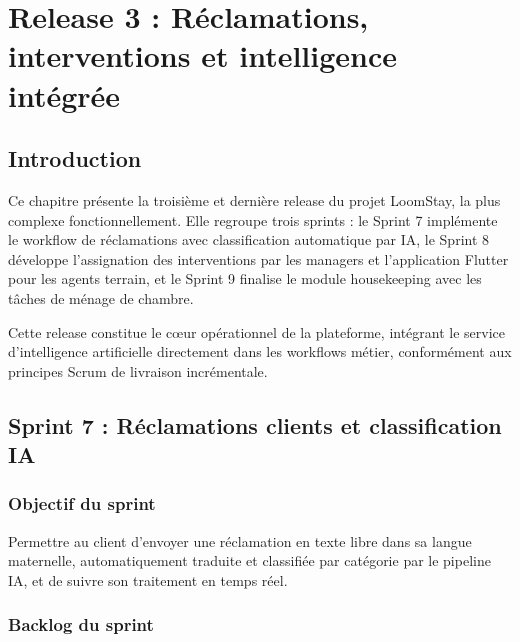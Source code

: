 
\chapter{Release 3 : Réclamations, interventions et intelligence intégrée}
\label{chap:release3}

\section*{Introduction}

Ce chapitre présente la troisième et dernière release du projet LoomStay, la plus complexe fonctionnellement. Elle regroupe trois sprints : le Sprint 7 implémente le workflow de réclamations avec classification automatique par IA, le Sprint 8 développe l'assignation des interventions par les managers et l'application Flutter pour les agents terrain, et le Sprint 9 finalise le module housekeeping avec les tâches de ménage de chambre.

Cette release constitue le cœur opérationnel de la plateforme, intégrant le service d'intelligence artificielle directement dans les workflows métier, conformément aux principes Scrum de livraison incrémentale.

\section{Sprint 7 : Réclamations clients et classification IA}
\label{sec:sprint7}

\subsection{Objectif du sprint}

Permettre au client d'envoyer une réclamation en texte libre dans sa langue maternelle, automatiquement traduite et classifiée par catégorie par le pipeline IA, et de suivre son traitement en temps réel.

\subsection{Backlog du sprint}

